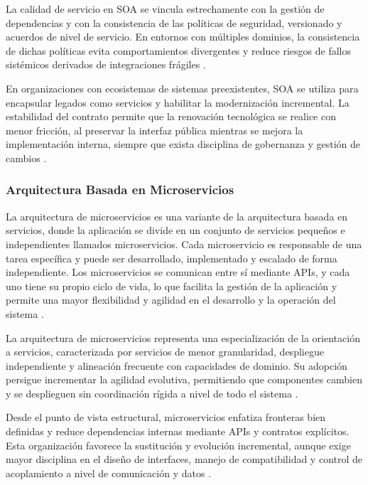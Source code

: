				La calidad de servicio en SOA se vincula estrechamente con la gestión de dependencias y con la consistencia de las políticas de seguridad, versionado y acuerdos de nivel de servicio. En entornos con múltiples dominios, la consistencia de dichas políticas evita comportamientos divergentes y reduce riesgos de fallos sistémicos derivados de integraciones frágiles \cite{Niknejad2020Understanding}.
				
				En organizaciones con ecosistemas de sistemas preexistentes, SOA se utiliza para encapsular legados como servicios y habilitar la modernización incremental. La estabilidad del contrato permite que la renovación tecnológica se realice con menor fricción, al preservar la interfaz pública mientras se mejora la implementación interna, siempre que exista disciplina de gobernanza y gestión de cambios \cite{Niknejad2020Understanding}.
				

		\subsubsection{Arquitectura Basada en Microservicios}
		\noindent
			La arquitectura de microservicios es una variante de la arquitectura basada en servicios, donde la aplicación se divide en un conjunto de servicios pequeños e independientes llamados microservicios. Cada microservicio es responsable de una tarea específica y puede ser desarrollado, implementado y escalado de forma independiente. Los microservicios se comunican entre sí mediante APIs, y cada uno tiene su propio ciclo de vida, lo que facilita la gestión de la aplicación y permite una mayor flexibilidad y agilidad en el desarrollo y la operación del sistema \cite{Rusek2021}.
			
			La arquitectura de microservicios representa una especialización de la orientación a servicios, caracterizada por servicios de menor granularidad, despliegue independiente y alineación frecuente con capacidades de dominio. Su adopción persigue incrementar la agilidad evolutiva, permitiendo que componentes cambien y se desplieguen sin coordinación rígida a nivel de todo el sistema \cite{Aksakalli2021Deployment}.
			
			Desde el punto de vista estructural, microservicios enfatiza fronteras bien definidas y reduce dependencias internas mediante APIs y contratos explícitos. Esta organización favorece la sustitución y evolución incremental, aunque exige mayor disciplina en el diseño de interfaces, manejo de compatibilidad y control de acoplamiento a nivel de comunicación y datos \cite{Aksakalli2021Deployment}.
			
